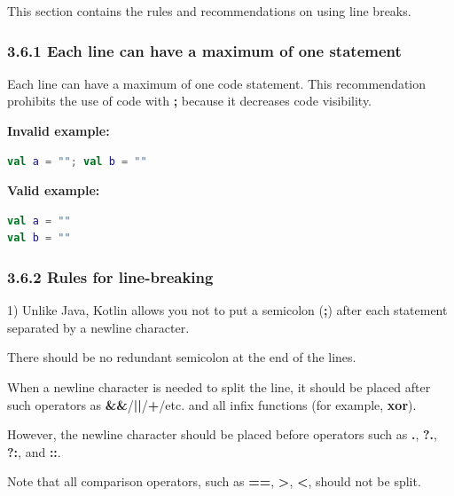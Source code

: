 \label{sec:3.6}

This section contains the rules and recommendations on using line breaks.

\subsubsection*{\textbf{3.6.1 Each line can have a maximum of one statement}}
\leavevmode\newline

\label{sec:3.6.1}

Each line can have a maximum of one code statement. This recommendation prohibits the use of code with \textbf{;} because it decreases code visibility.



\textbf{Invalid example:}

\begin{lstlisting}[language=Kotlin]
val a = ""; val b = ""
\end{lstlisting}


\textbf{Valid example:}

\begin{lstlisting}[language=Kotlin]
val a = ""
val b = ""
\end{lstlisting}


\subsubsection*{\textbf{3.6.2 Rules for line-breaking}}
\leavevmode\newline

\label{sec:3.6.2}



1) Unlike Java, Kotlin allows you not to put a semicolon (\textbf{;}) after each statement separated by a newline character.

    There should be no redundant semicolon at the end of the lines.

 

When a newline character is needed to split the line, it should be placed after such operators as \textbf{\&\&}/\textbf{||}/\textbf{+}/etc. and all infix functions (for example, \textbf{xor}).

However, the newline character should be placed before operators such as \textbf{.}, \textbf{?.}, \textbf{?:}, and \textbf{::}.



Note that all comparison operators, such as \textbf{==}, \textbf{>}, \textbf{<}, should not be split.



